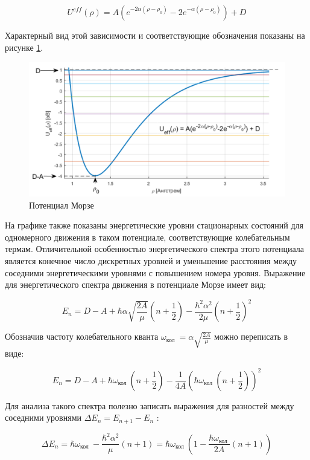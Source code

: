 \documentclass[11.5pt,a4paper,russian]{article}
\begin{document}
$$
U^{e f f}(\rho)=A\left(e^{-2 \alpha\left(\rho-\rho_0\right)}-2 e^{-\alpha\left(\rho-\rho_0\right)}\right)+D
$$

Характерный вид этой зависимости и соответствующие обозначения показаны на рисунке \ref{fig:morze}.

\begin{figure}[h!]
  \centering
  \includegraphics[width=\textwidth]{156e090e-cae2-483e-83c2-33e40d83edd8}  \caption{Потенциал Морзе}
  \label{fig:morze}
\end{figure}

На графике также показаны энергетические уровни стационарных состояний для одномерного движения в таком потенциале, соответствующие колебательным термам. Отличительной особенностью энергетического спектра этого потенциала является конечное число дискретных уровней и уменьшение расстояния между соседними энергетическими уровнями с повышением номера уровня. Выражение для энергетического спектра движения в потенциале Морзе имеет вид:

$$
E_n=D-A+\hbar \alpha \sqrt{\frac{2 A}{\mu}}\left(n+\frac{1}{2}\right)-\frac{\hbar^2 \alpha^2}{2 \mu}\left(n+\frac{1}{2}\right)^2
$$

Обозначив частоту колебательного кванта $\omega_{\text {кол }}=\alpha \sqrt{\frac{2 A}{\mu}}$ можно переписать в виде:

\begin{equation}\label{eq:E}
E_n=D-A+\hbar \omega_{\text {кол }}\left(n+\frac{1}{2}\right)-\frac{1}{4 A}\left(\hbar \omega_{\text {кол }}\left(n+\frac{1}{2}\right)\right)^2
\end{equation}

Для анализа такого спектра полезно записать выражения для разностей между соседними уровнями $\Delta E_n=E_{n+1}-E_n$ :

\begin{equation}\label{eq:deltaE}
\Delta E_n=\hbar \omega_{\text {кол }}-\frac{\hbar^2 \alpha^2}{\mu}(n+1)=\hbar \omega_{\text {кол }}\left(1-\frac{\hbar \omega_{\text {кол }}}{2 A}(n+1)\right)
\end{equation}
\end{document}

